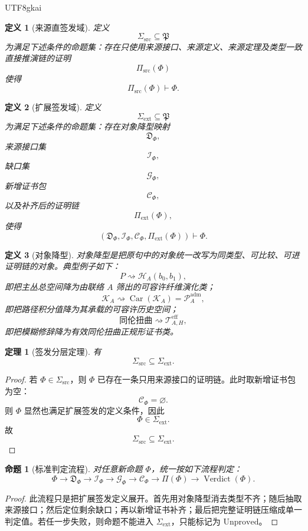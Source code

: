 \documentclass[12pt]{article}
\newtheorem{definition}{定义}[section]
\newtheorem{theorem}{定理}[section]
\newtheorem{proposition}{命题}[section]
\newcommand{\Unproved}{\mathrm{Unproved}}
\newcommand{\Verdict}{\operatorname{Verdict}}
\newcommand{\Car}{\operatorname{Car}}
\begin{document}
\begin{CJK*}{UTF8}{gkai}
\begin{definition}[来源直签发域]
定义
\[
\Sigma_{\mathrm{src}}\subseteq\mathfrak P
\]
为满足下述条件的命题集：存在只使用来源接口、来源定义、来源定理及类型一致直接推演链的证明
\[
\Pi_{\mathrm{src}}(\Phi)
\]
使得
\[
\Pi_{\mathrm{src}}(\Phi)\vdash \Phi.
\]
\end{definition}

\begin{definition}[扩展签发域]
定义
\[
\Sigma_{\mathrm{ext}}\subseteq\mathfrak P
\]
为满足下述条件的命题集：存在对象降型映射
\[
\mathfrak D_{\Phi},
\]
来源接口集
\[
\mathcal I_{\Phi},
\]
缺口集
\[
\mathcal G_{\Phi},
\]
新增证书包
\[
\mathcal C_{\Phi},
\]
以及补齐后的证明链
\[
\Pi_{\mathrm{ext}}(\Phi),
\]
使得
\[
(\mathfrak D_{\Phi},\mathcal I_{\Phi},\mathcal C_{\Phi},\Pi_{\mathrm{ext}}(\Phi))\vdash \Phi.
\]
\end{definition}

\begin{definition}[对象降型]
对象降型是把原句中的对象统一改写为同类型、可比较、可进证明链的对象。典型例子如下：
\[
P\rightsquigarrow \mathcal H_A(b_0,b_1),
\]
即把主丛总空间降为由联络 $A$ 筛出的可容许纤维演化类；
\[
\mathcal K_A\rightsquigarrow \Car(\mathcal K_A)=\mathcal P_A^{\mathrm{adm}},
\]
即把路径积分值降为其承载的可容许历史空间；
\[
\text{同伦扭曲}\rightsquigarrow \mathcal T_{A,H}^{\mathrm{eff}},
\]
即把模糊修辞降为有效同伦扭曲正规形证书类。
\end{definition}

\begin{theorem}[签发分层定理]
有
\[
\Sigma_{\mathrm{src}}\subseteq\Sigma_{\mathrm{ext}}.
\]
\end{theorem}

\begin{proof}
若 $\Phi\in\Sigma_{\mathrm{src}}$，则 $\Phi$ 已存在一条只用来源接口的证明链。此时取新增证书包为空：
\[
\mathcal C_{\Phi}=\varnothing.
\]
则 $\Phi$ 显然也满足扩展签发的定义条件，因此
\[
\Phi\in\Sigma_{\mathrm{ext}}.
\]
故
\[
\Sigma_{\mathrm{src}}\subseteq\Sigma_{\mathrm{ext}}.
\]
\end{proof}

\begin{proposition}[标准判定流程]
对任意新命题 $\Phi$，统一按如下流程判定：
\[
\Phi
\to
\mathfrak D_{\Phi}
\to
\mathcal I_{\Phi}
\to
\mathcal G_{\Phi}
\to
\mathcal C_{\Phi}
\to
\Pi(\Phi)
\to
\Verdict(\Phi).
\]
\end{proposition}

\begin{proof}
此流程只是把扩展签发定义展开。首先用对象降型消去类型不齐；随后抽取来源接口；然后定位剩余缺口；再以新增证书补齐；最后把完整证明链压缩成单一判定值。若任一步失败，则命题不能进入 $\Sigma_{\mathrm{ext}}$，只能标记为
  $\Unproved$。
\end{proof}


\end{CJK*}
\end{document}
